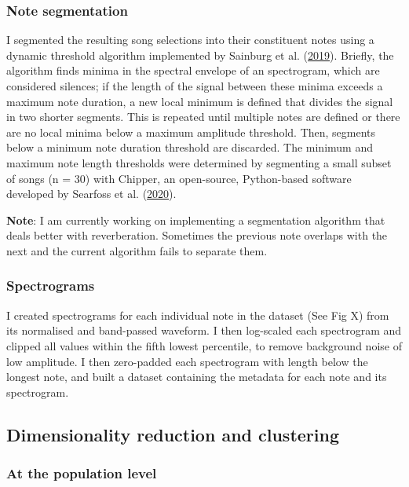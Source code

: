 \documentclass[]{report}
\begin{document}
\hypertarget{note-segmentation}{%
\subsubsection{Note segmentation}\label{note-segmentation}}

I segmented the resulting song selections into their constituent notes
using a dynamic threshold algorithm implemented by Sainburg et al.
(\protect\hyperlink{ref-Sainburg2019b}{2019}). Briefly, the algorithm
finds minima in the spectral envelope of an spectrogram, which are
considered silences; if the length of the signal between these minima
exceeds a maximum note duration, a new local minimum is defined that
divides the signal in two shorter segments. This is repeated until
multiple notes are defined or there are no local minima below a maximum
amplitude threshold. Then, segments below a minimum note duration
threshold are discarded. The minimum and maximum note length thresholds
were determined by segmenting a small subset of songs (n = 30) with
Chipper, an open-source, Python-based software developed by Searfoss et
al. (\protect\hyperlink{ref-Searfoss2020}{2020}).

\textbf{Note}: I am currently working on implementing a segmentation
algorithm that deals better with reverberation. Sometimes the previous
note overlaps with the next and the current algorithm fails to separate
them.

\hypertarget{spectrograms}{%
\subsubsection{Spectrograms}\label{spectrograms}}

I created spectrograms for each individual note in the dataset (See Fig
X) from its normalised and band-passed waveform. I then log-scaled each
spectrogram and clipped all values within the fifth lowest percentile,
to remove background noise of low amplitude. I then zero-padded each
spectrogram with length below the longest note, and built a dataset
containing the metadata for each note and its spectrogram.

\hypertarget{dimensionality-reduction-and-clustering}{%
\subsection{Dimensionality reduction and
clustering}\label{dimensionality-reduction-and-clustering}}

\hypertarget{at-the-population-level}{%
\subsubsection{At the population level}\label{at-the-population-level}}
\end{document}
